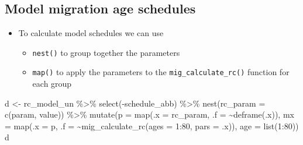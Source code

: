 \documentclass[
]{book}
\newenvironment{Shaded}{\begin{snugshade}}{\end{snugshade}}
\newcommand{\AttributeTok}[1]{\textcolor[rgb]{0.77,0.63,0.00}{#1}}
\newcommand{\DecValTok}[1]{\textcolor[rgb]{0.00,0.00,0.81}{#1}}
\newcommand{\FunctionTok}[1]{\textcolor[rgb]{0.00,0.00,0.00}{#1}}
\newcommand{\NormalTok}[1]{#1}
\newcommand{\OtherTok}[1]{\textcolor[rgb]{0.56,0.35,0.01}{#1}}
\newcommand{\SpecialCharTok}[1]{\textcolor[rgb]{0.00,0.00,0.00}{#1}}
\providecommand{\tightlist}{%
  \setlength{\itemsep}{0pt}\setlength{\parskip}{0pt}}
\begin{document}
\hypertarget{model-migration-age-schedules-5}{%
\subsection{Model migration age schedules}\label{model-migration-age-schedules-5}}

\begin{itemize}
\tightlist
\item
  To calculate model schedules we can use

  \begin{itemize}
  \tightlist
  \item
    \texttt{nest()} to group together the parameters
  \item
    \texttt{map()} to apply the parameters to the \texttt{mig\_calculate\_rc()} function for each group
  \end{itemize}
\end{itemize}

\begin{Shaded}
\begin{Highlighting}[]
\NormalTok{d }\OtherTok{\textless{}{-}}\NormalTok{ rc\_model\_un }\SpecialCharTok{\%\textgreater{}\%}
  \FunctionTok{select}\NormalTok{(}\SpecialCharTok{{-}}\NormalTok{schedule\_abb) }\SpecialCharTok{\%\textgreater{}\%}
  \FunctionTok{nest}\NormalTok{(}\AttributeTok{rc\_param =} \FunctionTok{c}\NormalTok{(param, value)) }\SpecialCharTok{\%\textgreater{}\%}
  \FunctionTok{mutate}\NormalTok{(}\AttributeTok{p =} \FunctionTok{map}\NormalTok{(}\AttributeTok{.x =}\NormalTok{ rc\_param, }\AttributeTok{.f =} \SpecialCharTok{\textasciitilde{}}\FunctionTok{deframe}\NormalTok{(.x)),}
         \AttributeTok{mx =} \FunctionTok{map}\NormalTok{(}\AttributeTok{.x =}\NormalTok{ p, }
                  \AttributeTok{.f =} \SpecialCharTok{\textasciitilde{}}\FunctionTok{mig\_calculate\_rc}\NormalTok{(}\AttributeTok{ages =} \DecValTok{1}\SpecialCharTok{:}\DecValTok{80}\NormalTok{, }\AttributeTok{pars =}\NormalTok{ .x)),}
         \AttributeTok{age =} \FunctionTok{list}\NormalTok{(}\DecValTok{1}\SpecialCharTok{:}\DecValTok{80}\NormalTok{))}
\NormalTok{d}
\end{Highlighting}
\end{Shaded}
\end{document}

